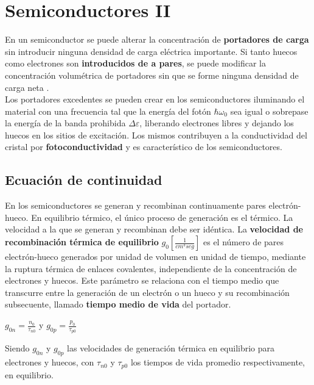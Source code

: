 \documentclass[oneside]{book}
\numberwithin{equation}{section}
\numberwithin{figure}{section}
\numberwithin{table}{section}
\begin{document}
	\chapter{Semiconductores II}	
	
		En un semiconductor se puede alterar la concentración de \textbf{portadores de carga} sin introducir ninguna densidad de carga eléctrica importante. Si tanto huecos como electrones son \textbf{introducidos de a pares}, se puede modificar la concentración volumétrica de portadores sin que se forme ninguna densidad de carga neta	.\\
		
		Los portadores excedentes se pueden crear en los semiconductores iluminando el material con una frecuencia tal que la energía del fotón $\hbar \omega_0$ sea igual o sobrepase la energía de la banda prohibida $\Delta \varepsilon$, liberando electrones libres y dejando los huecos en los sitios de excitación. Los mismos contribuyen a la conductividad del cristal por \textbf{fotoconductividad} y es característico de los semiconductores.
	
		\section{Ecuación de continuidad}
		
			En los semiconductores se generan y recombinan continuamente pares electrón-hueco. En equilibrio térmico, el único proceso de generación es el térmico. La velocidad a la que se generan y recombinan debe ser idéntica. La \textbf{velocidad de recombinación térmica de equilibrio} $g_0[\frac{1}{cm^3seg}]$ es el número de pares electrón-hueco generados por unidad de volumen en unidad de tiempo, mediante la ruptura térmica de enlaces covalentes, independiente de la concentración de electrones y huecos. Este parámetro se relaciona con el tiempo medio que transcurre entre la generación de un electrón o un hueco y su recombinación subsecuente, llamado \textbf{tiempo medio de vida} del portador.\\
			
			\begin{center}
				$\displaystyle g_{0n}=\frac{n_0}{\tau_{n0}}$ y $\displaystyle g_{0p}=\frac{p_0}{\tau_{p0}}$
			\end{center}
			
			Siendo $g_{0n}$ y $g_{0p}$ las velocidades de generación térmica en equilibrio para electrones y huecos, con $\tau_{n0}$ y $\tau_{p0}$ los tiempos de vida promedio respectivamente, en equilibrio.\\
			
\end{document}
